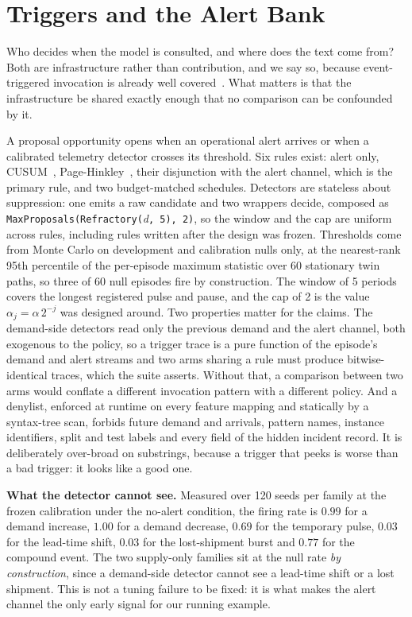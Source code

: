 \section{Triggers and the Alert Bank}
\label{sec:triggers}

Who decides when the model is consulted, and where does the text come from? Both
are infrastructure rather than contribution, and we say so, because
event-triggered invocation is already well covered~\cite{event-triggered-llm}.
What matters is that the infrastructure be shared exactly enough that no
comparison can be confounded by it.

A proposal opportunity opens when an operational alert arrives or when a
calibrated telemetry detector crosses its threshold. Six rules exist: alert only,
CUSUM~\cite{page-cusum}, Page-Hinkley~\cite{hinkley-cusum-1971}, their disjunction with the alert channel,
which is the primary rule, and two budget-matched schedules. Detectors are
stateless about suppression: one emits a raw candidate and two wrappers decide,
composed as \texttt{MaxProposals(Refractory(}\textit{d}\texttt{, 5), 2)}, so the
window and the cap are uniform across rules, including rules written after the
design was frozen. Thresholds come from Monte Carlo on development and
calibration nulls only, at the nearest-rank 95th percentile of the per-episode
maximum statistic over 60 stationary twin paths, so three of 60 null episodes
fire by construction. The window of 5 periods covers the longest registered pulse
and pause, and the cap of 2 is the value $\alpha_j = \alpha\,2^{-j}$ was designed
around. Two properties matter for the claims. The demand-side detectors read only the
previous demand and the alert channel, both exogenous to the policy, so a trigger
trace is a pure function of the episode's demand and alert streams and two arms
sharing a rule must produce bitwise-identical traces, which the suite asserts.
Without that, a comparison between two arms would conflate a different invocation
pattern with a different policy. And a denylist, enforced at runtime on
every feature mapping and statically by a syntax-tree scan, forbids future demand
and arrivals, pattern names, instance identifiers, split and test labels and every
field of the hidden incident record. It is deliberately over-broad on substrings,
because a trigger that peeks is worse than a bad trigger: it looks like a good
one.

\textbf{What the detector cannot see.} Measured over 120 seeds per family at the
frozen calibration under the no-alert condition, the firing rate is $0.99$ for a
demand increase, $1.00$ for a demand decrease, $0.69$ for the temporary pulse,
$0.03$ for the lead-time shift, $0.03$ for the lost-shipment burst and $0.77$ for
the compound event. The two supply-only families sit at the null rate \emph{by
construction}, since a demand-side detector cannot see a lead-time shift or a
lost shipment. This is not a tuning failure to be fixed: it is what makes the
alert channel the only early signal for our running example.

